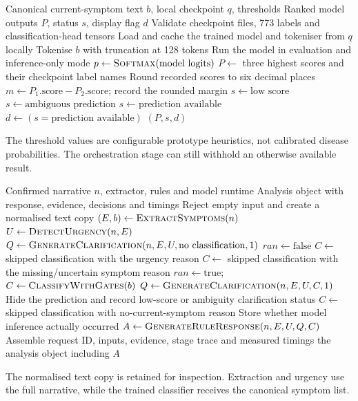 \documentclass[11pt,a4paper]{article}
\begin{document}
\newpage
\begin{algorithm}[H]
\caption{Run the trained BioBERT model and apply score display gates}
\label{alg:classify}
\begin{algorithmic}[1]
\Require Canonical current-symptom text $b$, local checkpoint $q$, thresholds
\Ensure Ranked model outputs $P$, status $s$, display flag $d$
\State Validate checkpoint files, 773 labels and classification-head tensors
\State Load and cache the trained model and tokeniser from $q$ locally
\State Tokenise $b$ with truncation at 128 tokens
\State Run the model in evaluation and inference-only mode
\State $p\gets\Call{Softmax}{\text{model logits}}$
\State $P\gets$ three highest scores and their checkpoint label names
\State Round recorded scores to six decimal places
\State $m\gets P_1.\text{score}-P_2.\text{score}$; record the rounded margin
  \State $s\gets\text{low score}$
  \State $s\gets\text{ambiguous prediction}$
\Else
  \State $s\gets\text{prediction available}$
\EndIf
\State $d\gets(s=\text{prediction available})$
\State \Return $(P,s,d)$
\end{algorithmic}
\end{algorithm}
The threshold values are configurable prototype heuristics, not calibrated disease
probabilities. The orchestration stage can still withhold an otherwise available result.

\newpage
\begin{algorithm}[H]
\caption{Orchestrate extraction, urgency, clarification and classification}
\label{alg:pipeline}
\begin{algorithmic}[1]
\Require Confirmed narrative $n$, extractor, rules and model runtime
\Ensure Analysis object with response, evidence, decisions and timings
\State Reject empty input and create a normalised text copy
\State $(E,b)\gets\Call{ExtractSymptoms}{n}$
\State $U\gets\Call{DetectUrgency}{n,E}$
\State $Q\gets\Call{GenerateClarification}{n,E,U,\text{no classification},1}$
\State $ran\gets\text{false}$
  \State $C\gets$ skipped classification with the urgency reason
  \State $C\gets$ skipped classification with the missing/uncertain symptom reason
  \State $ran\gets\text{true}$; $C\gets\Call{ClassifyWithGates}{b}$
  \State $Q\gets\Call{GenerateClarification}{n,E,U,C,1}$
    \State Hide the prediction and record low-score or ambiguity clarification status
  \EndIf
\Else
  \State $C\gets$ skipped classification with no-current-symptom reason
\EndIf
\State Store whether model inference actually occurred
\State $A\gets\Call{GenerateRuleResponse}{n,E,U,Q,C}$
\State Assemble request ID, inputs, evidence, stage trace and measured timings
\State \Return the analysis object including $A$
\end{algorithmic}
\end{algorithm}
The normalised text copy is retained for inspection. Extraction and urgency use
the full narrative, while the trained classifier receives the canonical symptom list.
\end{document}
